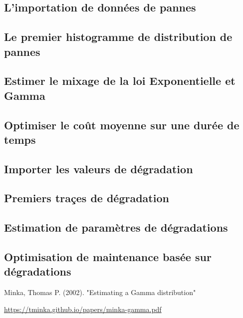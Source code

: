 \documentclass[10pt,a4paper]{article}
\begin{document}
\subsection{L'importation de données de pannes}
\label{annexe:import_pannes}

\subsection{Le premier histogramme de distribution de pannes}
\label{annexe:premier_histo}

\subsection{Estimer le mixage de la loi Exponentielle et Gamma}
\label{annexe:em_exp_gamma}

\subsection{Optimiser le coût moyenne sur une durée de temps}
\label{annexe:optim_e_c}

\subsection{Importer les valeurs de dégradation}
\label{annexe:import_degrad}

\subsection{Premiers traçes de dégradation}
\label{annexe:premier_plot_degrad}

\subsection{Estimation de paramètres de dégradations}
\label{annexe:estim_degrad}

\subsection{Optimisation de maintenance basée sur dégradations}
\label{annexe:optim_degrad}


\begin{thebibliography}{9}
     Minka, Thomas P. (2002). "Estimating a Gamma distribution"

    \url{https://tminka.github.io/papers/minka-gamma.pdf}
\end{thebibliography}
\end{document}
